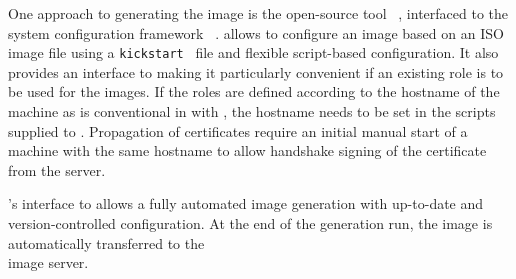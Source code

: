 
One approach to generating the image is the open-source tool
\Packer~\cite{packer}, interfaced to the system configuration framework \Puppet~\cite{puppet}.
\Packer allows to configure an image based on an ISO image file using a \texttt{kickstart}~\cite{kickstart} file and flexible script-based configuration. 
It also provides an interface to \Puppet making it particularly convenient if an existing \Puppet role is to be used for the images. If the roles are defined according to the hostname of the machine as is conventional in \Puppet with \Hieradata, the hostname needs to be set in the scripts supplied to \Packer. Propagation of certificates require an initial manual start of a machine with the same hostname to allow handshake signing of the certificate from the \Puppet server.

\Packer's interface to \Puppet allows a fully automated image generation with up-to-date and version-controlled configuration. At the end of the generation run, the image is automatically transferred to the \\\Openstack image server.

